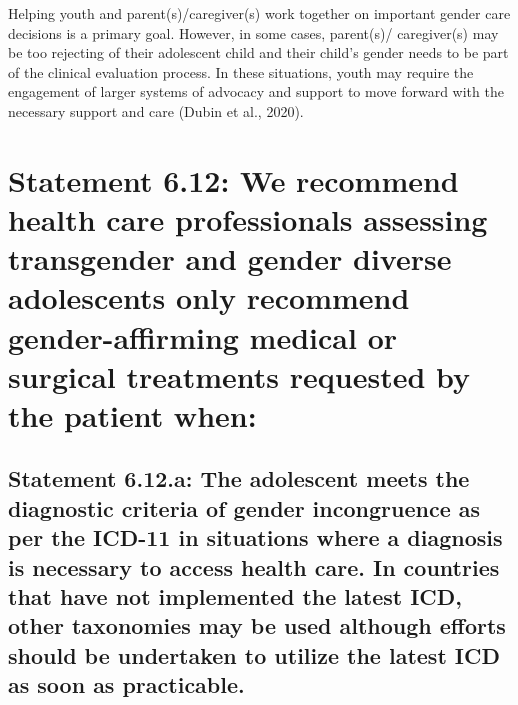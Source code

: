 \documentclass[
]{book}
\begin{document}
Helping youth and parent(s)/caregiver(s) work
together on important gender care decisions is a
primary goal. However, in some cases, parent(s)/
caregiver(s) may be too rejecting of their adolescent child and their child's gender needs to be
part of the clinical evaluation process. In these
situations, youth may require the engagement of
larger systems of advocacy and support to move
forward with the necessary support and care
(Dubin et al., 2020).

\hypertarget{statement-6.12-we-recommend-health-care-professionals-assessing-transgender-and-gender-diverse-adolescents-only-recommend-gender-affirming-medical-or-surgical-treatments-requested-by-the-patient-when}{%
\section*{Statement 6.12: We recommend health care professionals assessing transgender and gender diverse adolescents only recommend gender-affirming medical or surgical treatments requested by the patient when:}\label{statement-6.12-we-recommend-health-care-professionals-assessing-transgender-and-gender-diverse-adolescents-only-recommend-gender-affirming-medical-or-surgical-treatments-requested-by-the-patient-when}}

\hypertarget{statement-6.12.a-the-adolescent-meets-the-diagnostic-criteria-of-gender-incongruence-as-per-the-icd-11-in-situations-where-a-diagnosis-is-necessary-to-access-health-care.-in-countries-that-have-not-implemented-the-latest-icd-other-taxonomies-may-be-used-although-efforts-should-be-undertaken-to-utilize-the-latest-icd-as-soon-as-practicable.}{%
\subsection*{Statement 6.12.a: The adolescent meets the diagnostic criteria of gender incongruence as per the ICD-11 in situations where a diagnosis is necessary to access health care. In countries that have not implemented the latest ICD, other taxonomies may be used although efforts should be undertaken to utilize the latest ICD as soon as practicable.}\label{statement-6.12.a-the-adolescent-meets-the-diagnostic-criteria-of-gender-incongruence-as-per-the-icd-11-in-situations-where-a-diagnosis-is-necessary-to-access-health-care.-in-countries-that-have-not-implemented-the-latest-icd-other-taxonomies-may-be-used-although-efforts-should-be-undertaken-to-utilize-the-latest-icd-as-soon-as-practicable.}}
\end{document}
